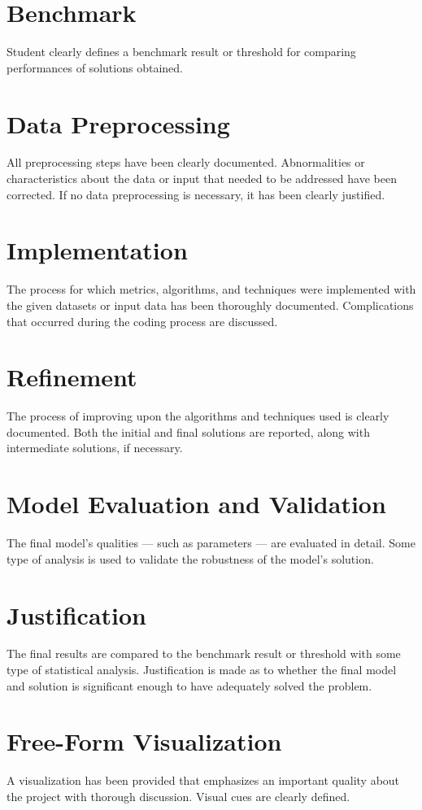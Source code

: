 \documentclass{article}
\begin{document}
    \section{Benchmark}
    Student clearly defines a benchmark result or threshold for comparing performances of solutions obtained.

    \section{Data Preprocessing}
    All preprocessing steps have been clearly documented. Abnormalities or characteristics about the data or input that needed to be addressed have been corrected. If no data preprocessing is necessary, it has been clearly justified.
    
    \section{Implementation}    
    The process for which metrics, algorithms, and techniques were implemented with the given datasets or input data has been thoroughly documented. Complications that occurred during the coding process are discussed.
    
    \section{Refinement}  
    The process of improving upon the algorithms and techniques used is clearly documented. Both the initial and final solutions are reported, along with intermediate solutions, if necessary.

    \section{Model Evaluation and Validation}
    The final model’s qualities — such as parameters — are evaluated in detail. Some type of analysis is used to validate the robustness of the model’s solution.

    \section{Justification}
    The final results are compared to the benchmark result or threshold with some type of statistical analysis. Justification is made as to whether the final model and solution is significant enough to have adequately solved the problem.

    \section{Free-Form Visualization}
    A visualization has been provided that emphasizes an important quality about the project with thorough discussion. Visual cues are clearly defined.
\end{document}
